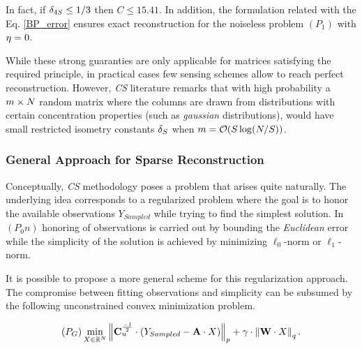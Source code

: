 In fact, if $\delta_{4S} \leq 1/3$ then $C \leq 15.41$. In addition, the formulation related with the Eq. \eqref{BP_error} ensures exact reconstruction for the noiseless problem $(P_1)$ with ${\eta} = 0$.

While these strong guaranties are only applicable for matrices satisfying the required principle, in practical cases few sensing schemes allow to reach perfect reconstruction. However, \emph{CS} literature remarks that with high probability a $m \times N$ random matrix where the columns are drawn from distributions with certain concentration properties (such as \emph{gaussian} distributions),  would have small restricted isometry constants $\delta_S$ when $m = {\cal O}(S \log(N/S))$.




\subsubsection{General Approach for Sparse Reconstruction}
\label{subSecGeneralNCS}

Conceptually, \emph{CS} methodology poses a problem that arises quite naturally. The underlying idea corresponds to a regularized problem where the goal is to honor the available observations $Y_{Sampled}$ while trying to find the simplest solution. In $(P_0n)$ honoring of observations is carried out by bounding the \emph{Euclidean} error while the simplicity of the solution is achieved by minimizing  $\ell_0$-norm or  $\ell_1$-norm.

It is possible to propose a more general scheme for this regularization approach. The compromise between fitting observations and simplicity can be subsumed by the following unconstrained convex minimization problem.

\begin{equation}
(P_G) \min_{X \in \mathbb{R}^{N}} \left\| \textbf{C}_{u}^{\frac{-1}{2}} \cdot \left( Y_{Sampled} - \textbf{A}\cdot X \right) \right\| _{p}  + \gamma \cdot \left\| \textbf{W} \cdot X \right\| _{q} .
\label{eq:GeneralCS}
\end{equation}

